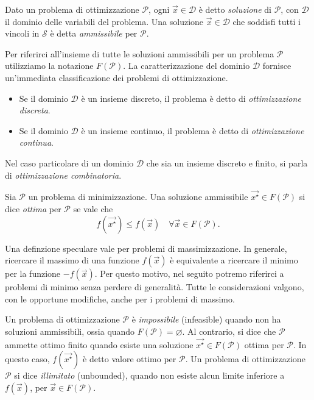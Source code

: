 \begin{definition}
Dato un problema di ottimizzazione $\mathcal{P}$, ogni $\vec{x} \in
\mathcal{D}$ è detto \textit{soluzione} di $\mathcal{P}$, con $\mathcal{D}$
il dominio delle variabili del problema. Una soluzione $\vec{x} \in
\mathcal{D}$ che soddisfi tutti i vincoli in $\mathcal{S}$ è detta
\textit{ammissibile} per $\mathcal{P}$.
\end{definition}
Per riferirci all'insieme di tutte le soluzioni ammissibili per un problema
$\mathcal{P}$ utilizziamo la notazione $F(\mathcal{P})$. La
caratterizzazione del dominio $\mathcal{D}$ fornisce un'immediata
classificazione dei problemi di ottimizzazione.
\begin{itemize}
    \item Se il dominio $\mathcal{D}$ è un insieme discreto, il problema è
        detto di \textit{ottimizzazione discreta}.
    \item Se il dominio $\mathcal{D}$ è un insieme continuo, il problema è
        detto di \textit{ottimizzazione continua}.
\end{itemize}
Nel caso particolare di un dominio $\mathcal{D}$ che sia un insieme
discreto e finito, si parla di \textit{ottimizzazione combinatoria}.
\begin{definition}
Sia $\mathcal{P}$ un problema di minimizzazione. Una soluzione ammissibile
$\vec{x^{\star}} \in F(\mathcal{P})$ si dice \textit{ottima} per
$\mathcal{P}$ se vale che
\[
    f(\vec{x^{\star}}) \le f(\vec{x}) \quad
    \forall \vec{x} \in F(\mathcal{P}).
\]
\end{definition}
Una definzione speculare vale per problemi di massimizzazione. In generale,
ricercare il massimo di una funzione $f(\vec{x})$ è equivalente a ricercare
il minimo per la funzione ${-f(\vec{x})}$. Per questo motivo, nel seguito
potremo riferirci a problemi di minimo senza perdere di generalità. Tutte
le considerazioni valgono, con le opportune modifiche, anche per i problemi
di massimo.

Un problema di ottimizzazione $\mathcal{P}$ è \textit{impossibile}
(infeasible) quando non ha soluzioni ammissibili, ossia quando
$F(\mathcal{P}) = \varnothing$. Al contrario, si dice che $\mathcal{P}$
ammette ottimo finito quando esiste una soluzione $\vec{x^{\star}} \in
F(\mathcal{P})$ ottima per $\mathcal{P}$. In questo caso,
$f(\vec{x^{\star}})$ è detto valore ottimo per $\mathcal{P}$. Un problema di
ottimizzazione $\mathcal{P}$ si dice \textit{illimitato} (unbounded),
quando non esiste alcun limite inferiore a $f(\vec{x})$, per $\vec{x} \in
F(\mathcal{P})$.

